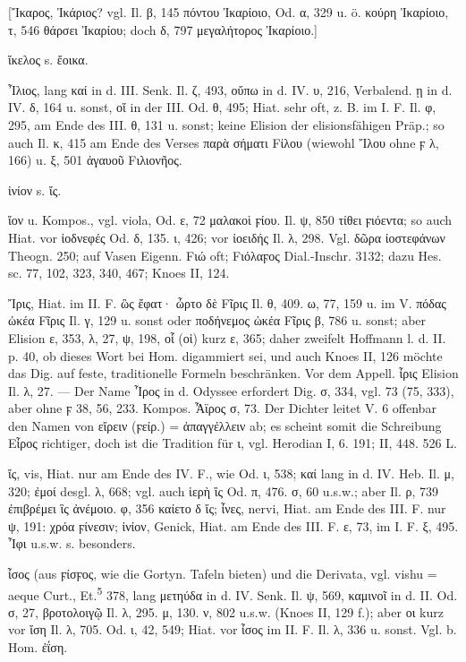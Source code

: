 [Ἴκαρος, Ἰκάριος? vgl. Il. β, 145 πόντου Ἰκαρίοιο, Od. α, 329 u. ö. κούρη Ἰκαρίοιο, τ, 546 θάρσει Ἰκαρίου; doch δ, 797 μεγαλήτορος Ἰκαρίοιο.]

ἴκελος s. ἔοικα.

Ἶλιος, lang καί in d. III. Senk. Il. ζ, 493, οὔπω in d. IV. υ, 216, Verbalend. ῃ in d. IV. δ, 164 u. sonst, οἵ in der III. Od. θ, 495; Hiat. sehr oft, z. B. im I. F. Il. φ, 295, am Ende des III. θ, 131 u. sonst; keine Elision der elisionsfähigen Präp.; so auch Il. κ, 415 am Ende des Verses παρὰ σήματι Fίλου (wiewohl Ἴλου ohne ϝ λ, 166) u. ξ, 501 ἀγαυοῦ Fιλιονῆος.

ἰνίον s. ἴς.

ἴον u. Kompos., vgl. viola, Od. ε, 72 μαλακοὶ ϝίου. Il. ψ, 850 τίθει ϝιόεντα; so auch Hiat. vor ἰοδνεφές Od. δ, 135. ι, 426; vor ἰοειδής Il. λ, 298. Vgl. δῶρα ἰοστεφάνων Theogn. 250; auf Vasen Eigenn. Fιώ oft; Fιόλαϝος Dial.-Inschr. 3132; dazu Hes. sc. 77, 102, 323, 340, 467; Knoes II, 124.

Ἴρις, Hiat. im II. F. ὣς ἔφατ· ὦρτο δὲ Fῖρις Il. θ, 409. ω, 77, 159 u. im V. πόδας ὠκέα Fῖρις Il. γ, 129 u. sonst oder ποδήνεμος ὠκέα Fῖρις β, 786 u. sonst; aber Elision ε, 353, λ, 27, ψ, 198, οἷ (οἱ) kurz ε, 365; daher zweifelt Hoffmann l. d. II. p. 40, ob dieses Wort bei Hom. digammiert sei, und auch Knoes II, 126 möchte das Dig. auf feste, traditionelle Formeln beschränken. Vor dem Appell. ἶρις Elision Il. λ, 27. — Der Name Ἶρος in d. Odyssee erfordert Dig. σ, 334, vgl. 73 (75, 333), aber ohne ϝ 38, 56, 233. Kompos. Ἆϊρος σ, 73. Der Dichter leitet V. 6 offenbar den Namen von εἴρειν (ϝείρ.) = ἀπαγγέλλειν ab; es scheint somit die Schreibung Εἶρος richtiger, doch ist die Tradition für ι, vgl. Herodian I, 6. 191; II, 448. 526 L.

ἴς, vis, Hiat. nur am Ende des IV. F., wie Od. ι, 538; καί lang in d. IV. Heb. Il. μ, 320; ἐμοί desgl. λ, 668; vgl. auch ἱερὴ ἲς Od. π, 476. σ, 60 u.s.w.; aber Il. ρ, 739 ἐπιβρέμει ἲς ἀνέμοιο. φ, 356 καίετο δ ἴς; ἶνες, nervi, Hiat. am Ende des III. F. nur ψ, 191: χρόα ϝίνεσιν; ἰνίον, Genick, Hiat. am Ende des III. F. ε, 73, im I. F. ξ, 495. Ἶφι u.s.w. s. besonders.

ἶσος (aus ϝίσϝος, wie die Gortyn. Tafeln bieten) und die Derivata, vgl.  vishu = aeque Curt., Et.\textsuperscript{5} 378, lang μετηύδα in d. IV. Senk. Il. ψ, 569, καμινοῖ in d. II. Od. σ, 27, βροτολοιγῷ Il. λ, 295. μ, 130. ν, 802 u.s.w. (Knoes II, 129 f.); aber οι kurz vor ἴση Il. λ, 705. Od. ι, 42, 549; Hiat. vor ἶσος im II. F. Il. λ, 336 u. sonst. Vgl. b. Hom. ἐΐση.

